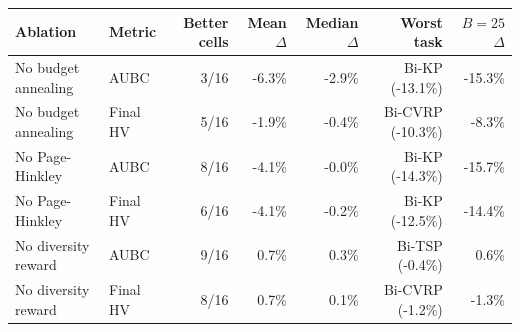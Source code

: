 \begin{tabular}{llrrrrr}
\toprule
Ablation & Metric & Better cells & Mean $\Delta$ & Median $\Delta$ & Worst task & $B=25$ $\Delta$ \\
\midrule
No budget annealing & AUBC & 3/16 & -6.3\% & -2.9\% & Bi-KP (-13.1\%) & -15.3\% \\
No budget annealing & Final HV & 5/16 & -1.9\% & -0.4\% & Bi-CVRP (-10.3\%) & -8.3\% \\
No Page-Hinkley & AUBC & 8/16 & -4.1\% & -0.0\% & Bi-KP (-14.3\%) & -15.7\% \\
No Page-Hinkley & Final HV & 6/16 & -4.1\% & -0.2\% & Bi-KP (-12.5\%) & -14.4\% \\
No diversity reward & AUBC & 9/16 & 0.7\% & 0.3\% & Bi-TSP (-0.4\%) & 0.6\% \\
No diversity reward & Final HV & 8/16 & 0.7\% & 0.1\% & Bi-CVRP (-1.2\%) & -1.3\% \\
\bottomrule
\end{tabular}
